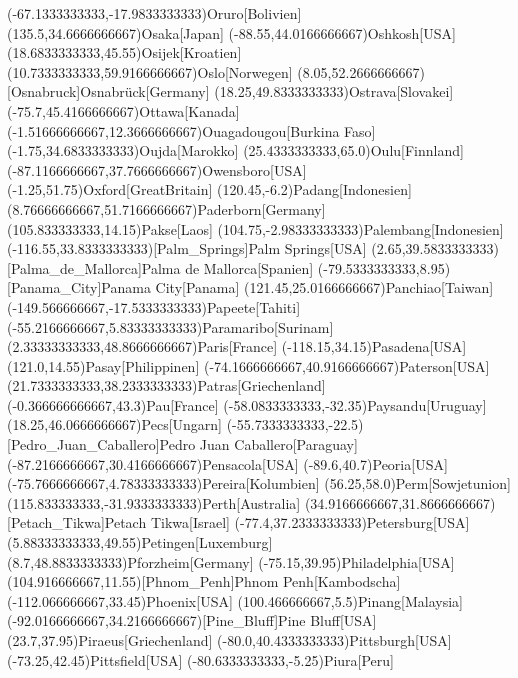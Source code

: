 \mapput(-67.1333333333,-17.9833333333){Oruro}[Bolivien]
\mapput(135.5,34.6666666667){Osaka}[Japan]
\mapput(-88.55,44.0166666667){Oshkosh}[USA]
\mapput(18.6833333333,45.55){Osijek}[Kroatien]
\mapput(10.7333333333,59.9166666667){Oslo}[Norwegen]
\mapput(8.05,52.2666666667)[Osnabruck]{Osnabrück}[Germany]
\mapput(18.25,49.8333333333){Ostrava}[Slovakei]
\mapput(-75.7,45.4166666667){Ottawa}[Kanada]
\mapput(-1.51666666667,12.3666666667){Ouagadougou}[Burkina Faso]
\mapput(-1.75,34.6833333333){Oujda}[Marokko]
\mapput(25.4333333333,65.0){Oulu}[Finnland]
\mapput(-87.1166666667,37.7666666667){Owensboro}[USA]
\mapput(-1.25,51.75){Oxford}[GreatBritain]
\mapput(120.45,-6.2){Padang}[Indonesien]
\mapput(8.76666666667,51.7166666667){Paderborn}[Germany]
\mapput(105.833333333,14.15){Pakse}[Laos]
\mapput(104.75,-2.98333333333){Palembang}[Indonesien]
\mapput(-116.55,33.8333333333)[Palm_Springs]{Palm Springs}[USA]
\mapput(2.65,39.5833333333)[Palma_de_Mallorca]{Palma de Mallorca}[Spanien]
\mapput(-79.5333333333,8.95)[Panama_City]{Panama City}[Panama]
\mapput(121.45,25.0166666667){Panchiao}[Taiwan]
\mapput(-149.566666667,-17.5333333333){Papeete}[Tahiti]
\mapput(-55.2166666667,5.83333333333){Paramaribo}[Surinam]
\mapput(2.33333333333,48.8666666667){Paris}[France]
\mapput(-118.15,34.15){Pasadena}[USA]
\mapput(121.0,14.55){Pasay}[Philippinen]
\mapput(-74.1666666667,40.9166666667){Paterson}[USA]
\mapput(21.7333333333,38.2333333333){Patras}[Griechenland]
\mapput(-0.366666666667,43.3){Pau}[France]
\mapput(-58.0833333333,-32.35){Paysandu}[Uruguay]
\mapput(18.25,46.0666666667){Pecs}[Ungarn]
\mapput(-55.7333333333,-22.5)[Pedro_Juan_Caballero]{Pedro Juan Caballero}[Paraguay]
\mapput(-87.2166666667,30.4166666667){Pensacola}[USA]
\mapput(-89.6,40.7){Peoria}[USA]
\mapput(-75.7666666667,4.78333333333){Pereira}[Kolumbien]
\mapput(56.25,58.0){Perm}[Sowjetunion]
\mapput(115.833333333,-31.9333333333){Perth}[Australia]
\mapput(34.9166666667,31.8666666667)[Petach_Tikwa]{Petach Tikwa}[Israel]
\mapput(-77.4,37.2333333333){Petersburg}[USA]
\mapput(5.88333333333,49.55){Petingen}[Luxemburg]
\mapput(8.7,48.8833333333){Pforzheim}[Germany]
\mapput(-75.15,39.95){Philadelphia}[USA]
\mapput(104.916666667,11.55)[Phnom_Penh]{Phnom Penh}[Kambodscha]
\mapput(-112.066666667,33.45){Phoenix}[USA]
\mapput(100.466666667,5.5){Pinang}[Malaysia]
\mapput(-92.0166666667,34.2166666667)[Pine_Bluff]{Pine Bluff}[USA]
\mapput(23.7,37.95){Piraeus}[Griechenland]
\mapput(-80.0,40.4333333333){Pittsburgh}[USA]
\mapput(-73.25,42.45){Pittsfield}[USA]
\mapput(-80.6333333333,-5.25){Piura}[Peru]
